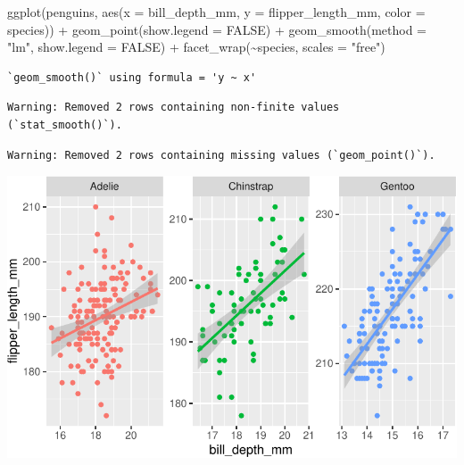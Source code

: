 \documentclass[
  a4paper,
  DIV=11,
  numbers=noendperiod,
  oneside]{scrreprt}
\newenvironment{Shaded}{}{}
\newcommand{\AttributeTok}[1]{\textcolor[rgb]{0.84,0.23,0.29}{#1}}
\newcommand{\ConstantTok}[1]{\textcolor[rgb]{0.00,0.36,0.77}{#1}}
\newcommand{\FunctionTok}[1]{\textcolor[rgb]{0.44,0.26,0.76}{#1}}
\newcommand{\NormalTok}[1]{\textcolor[rgb]{0.14,0.16,0.18}{#1}}
\newcommand{\SpecialCharTok}[1]{\textcolor[rgb]{0.00,0.36,0.77}{#1}}
\newcommand{\StringTok}[1]{\textcolor[rgb]{0.01,0.18,0.38}{#1}}
\begin{document}
\begin{Shaded}
\begin{Highlighting}[]
\FunctionTok{ggplot}\NormalTok{(penguins, }\FunctionTok{aes}\NormalTok{(}\AttributeTok{x =}\NormalTok{ bill\_depth\_mm, }\AttributeTok{y =}\NormalTok{ flipper\_length\_mm,}
                     \AttributeTok{color =}\NormalTok{ species)) }\SpecialCharTok{+}
  \FunctionTok{geom\_point}\NormalTok{(}\AttributeTok{show.legend =} \ConstantTok{FALSE}\NormalTok{) }\SpecialCharTok{+}
  \FunctionTok{geom\_smooth}\NormalTok{(}\AttributeTok{method =} \StringTok{"lm"}\NormalTok{, }\AttributeTok{show.legend =} \ConstantTok{FALSE}\NormalTok{) }\SpecialCharTok{+}
  \FunctionTok{facet\_wrap}\NormalTok{(}\SpecialCharTok{\textasciitilde{}}\NormalTok{species, }\AttributeTok{scales =} \StringTok{"free"}\NormalTok{)}
\end{Highlighting}
\end{Shaded}

\begin{verbatim}
`geom_smooth()` using formula = 'y ~ x'
\end{verbatim}

\begin{verbatim}
Warning: Removed 2 rows containing non-finite values (`stat_smooth()`).
\end{verbatim}

\begin{verbatim}
Warning: Removed 2 rows containing missing values (`geom_point()`).
\end{verbatim}

\includegraphics{03-visualization_files/figure-pdf/unnamed-chunk-84-1.pdf}
\end{document}
